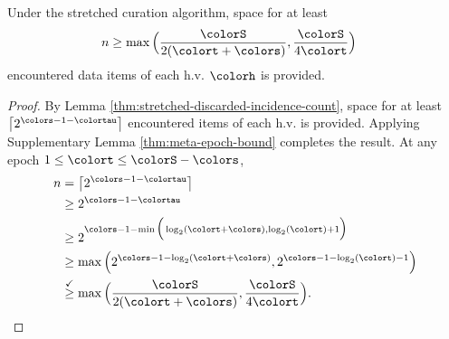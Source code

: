 \begin{corollary}
\label{thm:stretched-reservation-count}
Under the stretched curation algorithm, space for at least
\begin{align*}
n &\geq
\max\Big(
  \frac{\colorS}{2(\colort + \colors)},
  \frac{\colorS}{4\colort}
\Big)
\end{align*}
encountered data items of each h.v. $\colorh$ is provided.
\end{corollary}
\begin{proof}

By Lemma \ref{thm:stretched-discarded-incidence-count}, space for at least $\left\lceil 2^{\colors - 1 - \colortau} \right\rceil$ encountered items of each h.v. is provided.
Applying Supplementary Lemma \ref{thm:meta-epoch-bound} completes the result.
At any epoch $1 \leq \colort \leq \colorS - \colors$,
\begin{align*}
n
&= \left\lceil 2^{\colors - 1 - \colortau} \right\rceil\\
&\geq 2^{\colors - 1 - \colortau}\\
&\geq2^{\colors - 1 - \min\Big(
  \log_2(\colort + \colors),
  \log_2(\colort) + 1
\Big)}\\
&\geq \max\Big(
  2^{\colors - 1 - \log_2(\colort + \colors)},
  2^{\colors - 1 - \log_2(\colort) - 1}
\Big)\\
&\stackrel{\checkmark}{\geq} \max\Big(
  \frac{\colorS}{2(\colort + \colors)},
  \frac{\colorS}{4\colort}
\Big).
\end{align*}

\end{proof}
